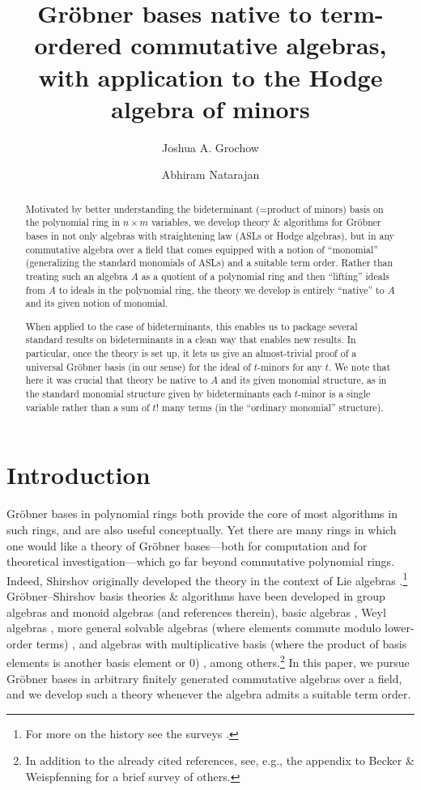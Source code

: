 \documentclass[11pt,reqno]{amsart}
\title[Gröbner bases native to certain commutative algebras, with applications]{Gröbner bases native to term-ordered commutative algebras, with application to the Hodge algebra of minors}
\author{Joshua A. Grochow}
\author{Abhiram Natarajan}
\theoremstyle{definition}
\numberwithin{equation}{section}
\begin{document}
\begin{abstract}
Motivated by better understanding the bideterminant (=product of minors) basis on the polynomial ring in $n \times m$ variables, we develop theory \& algorithms for Gröbner bases in not only algebras with straightening law (ASLs or Hodge algebras), but in any commutative algebra over a field that comes equipped with a notion of ``monomial'' (generalizing the standard monomials of ASLs) and a suitable term order. Rather than treating such an algebra $A$ as a quotient of a polynomial ring and then ``lifting'' ideals from $A$ to ideals in the polynomial ring, the theory we develop is entirely ``native'' to $A$ and its given notion of monomial.

When applied to the case of bideterminants, this enables us to package several standard results on bideterminants in a clean way that enables new results. In particular, once the theory is set up, it lets us give an almost-trivial proof of a universal Gröbner basis (in our sense) for the ideal of $t$-minors for any $t$. We note that here it was crucial that theory be native to $A$ and its given monomial structure, as in the standard monomial structure given by bideterminants each $t$-minor is a single variable rather than a sum of $t!$ many terms (in the ``ordinary monomial'' structure).
\end{abstract}

\maketitle

\setcounter{tocdepth}{3}

\tableofcontents


\section{Introduction}
Gröbner bases in polynomial rings both provide the core of most algorithms in such rings, and are also useful conceptually. Yet there are many rings in which one would like a theory of Gröbner bases---both for computation and for theoretical investigation---which go far beyond commutative polynomial rings. Indeed, Shirshov originally developed the theory in the context of Lie algebras \cite{shirshov}.\footnote{For more on the history see the surveys \cite{BFS, BokutChen}.} Gröbner--Shirshov basis theories \& algorithms have been developed in group algebras \cite{greenGroupBook} and monoid algebras \cite{reinert,moraMonoid} (and references therein), basic algebras \cite{FGKK, FFG}, Weyl algebras \cite{saito1998grobner}, more general solvable algebras (where elements commute modulo lower-order terms) \cite{KRW}, and algebras with multiplicative basis (where the product of basis elements is another basis element or 0) \cite{green}, among others.\footnote{In addition to the already cited references, see, e.g., the appendix to Becker \& Weispfenning \cite{BW} for a brief survey of others.} In this paper, we pursue Gröbner bases in arbitrary finitely generated commutative algebras over a field,
 and we develop such a theory whenever the algebra admits a suitable term order.
\end{document}
